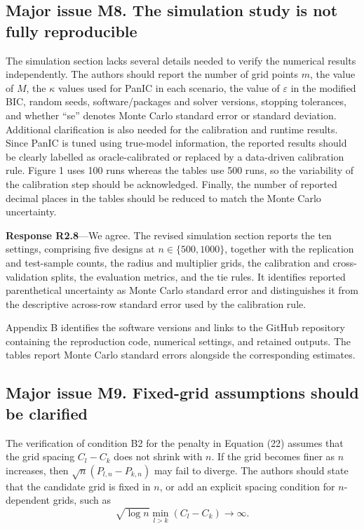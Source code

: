 \documentclass[11pt]{article}
\newcommand{\response}[1]{\par\noindent\textbf{Response #1}---}
\begin{document}
\subsection*{Major issue M8. The simulation study is not fully reproducible}
The simulation section lacks several details needed to verify the numerical results independently. The authors should report the number of grid points $m$, the value of $M$, the $\kappa$ values used for PanIC in each scenario, the value of $\varepsilon$ in the modified BIC, random seeds, software/packages and solver versions, stopping tolerances, and whether ``se'' denotes Monte Carlo standard error or standard deviation. Additional clarification is also needed for the calibration and runtime results. Since PanIC is tuned using true-model information, the reported results should be clearly labelled as oracle-calibrated or replaced by a data-driven calibration rule. Figure 1 uses 100 runs whereas the tables use 500 runs, so the variability of the calibration step should be acknowledged. Finally, the number of reported decimal places in the tables should be reduced to match the Monte Carlo uncertainty.

\response{R2.8}We agree. The revised simulation section reports the ten settings, comprising five designs at $n\in\{500,1000\}$, together with the replication and test-sample counts, the radius and multiplier grids, the calibration and cross-validation splits, the evaluation metrics, and the tie rules. It identifies reported parenthetical uncertainty as Monte Carlo standard error and distinguishes it from the descriptive across-row standard error used by the calibration rule.

Appendix B identifies the software versions and links to the GitHub repository containing the reproduction code, numerical settings, and retained outputs. The tables report Monte Carlo standard errors alongside the corresponding estimates.

\subsection*{Major issue M9. Fixed-grid assumptions should be clarified}
The verification of condition B2 for the penalty in Equation (22) assumes that the grid spacing $C_l-C_k$ does not shrink with $n$. If the grid becomes finer as $n$ increases, then $\sqrt n(P_{l,n}-P_{k,n})$ may fail to diverge. The authors should state that the candidate grid is fixed in $n$, or add an explicit spacing condition for $n$-dependent grids, such as
\[
\sqrt{\log n}\min_{l>k}(C_l-C_k)\to\infty.
\]
\end{document}

